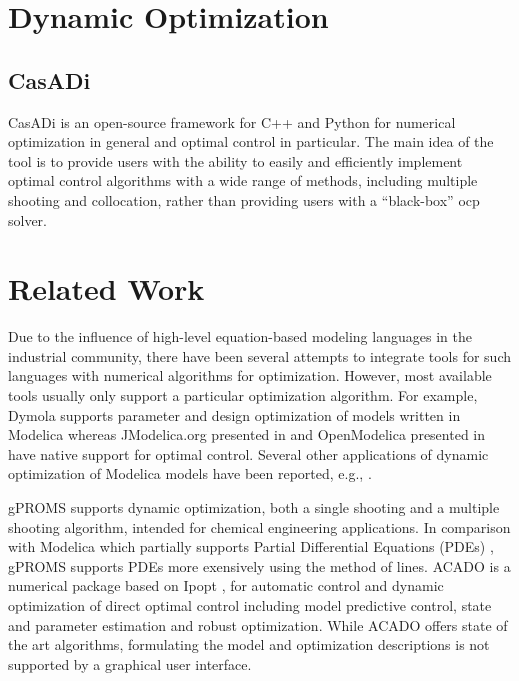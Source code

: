 \section{Dynamic Optimization}
\label{sec:dynamicoptimization}

\subsection{CasADi}
\label{sec:casadi}

CasADi \cite{casadi} is an open-source framework for C++ and Python for numerical optimization in general and optimal control in particular. The main idea of the tool is to provide users with the ability to easily and efficiently implement optimal control algorithms with a wide range of methods, including multiple shooting and collocation, rather than providing users with a “black-box” \acrshort{ocp} solver.

\section{Related Work}
\label{sec:relatedwork}

Due to the influence of high-level equation-based modeling languages in the industrial community, there have been several attempts to integrate tools for such languages with numerical algorithms for optimization. However, most available tools usually only support a particular optimization algorithm. For example, Dymola supports parameter and design optimization of models written in Modelica whereas JModelica.org presented in \cite{akesson} and OpenModelica presented in \cite{bernhard} have native support for optimal control. Several other applications of dynamic optimization of Modelica models have been reported, e.g., \cite{relatedworkjohan,relatedworkfranke, relatedworklarson,relatedworkjan, relatedworkprolss}. 

gPROMS \cite{gproms} supports dynamic optimization, both a single shooting and a multiple shooting algorithm, intended for chemical engineering applications. In comparison with Modelica which partially supports Partial Differential Equations (PDEs) \cite{pdelevon,pdelevonpeter}, gPROMS supports PDEs more exensively using the method of lines. ACADO \cite{acado,acadoboris} is a numerical package based on Ipopt \cite{wachter,ipopt}, for automatic control and dynamic optimization of direct optimal control including model predictive control, state and parameter estimation and robust optimization. While ACADO offers state of the art algorithms, formulating the model and optimization descriptions is not supported by a graphical user interface. 

